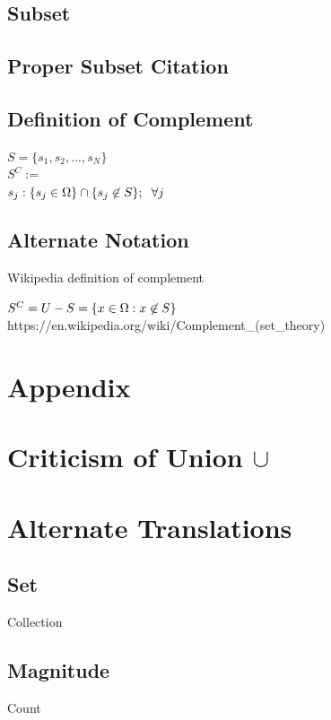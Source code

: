 \documentclass[11pt]{article}
\begin{document}
\subsection{Subset}



\subsection{Proper Subset Citation}




\subsection{Definition of Complement}
\begin{center}
$
S = \{ s_1,s_2,...,s_N \}
$
\\
$
S^C :=
$
\\
$
s_j: \{ s_j \in \Omega\} \cap \{s_j \not \in S\}; \hspace{2mm} \forall j
$
\end{center}
\subsection{Alternate Notation}
Wikipedia definition of complement
\begin{center}
$
S^C = U - S = \{x \in \Omega : x \not \in S\} \hspace{3mm} 
$
https://en.wikipedia.org/wiki/Complement\_(set\_theory)
\end{center}




\newpage
\section*{Appendix}

\section{Criticism of Union $\cup$}


\section{Alternate Translations}
\subsection{Set}
Collection
\subsection{Magnitude}
Count
\end{document}

